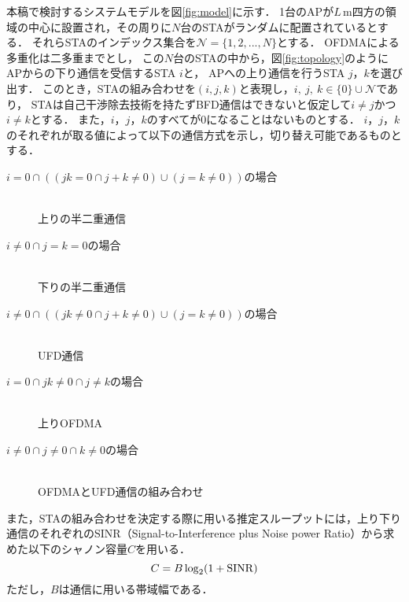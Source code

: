 \documentclass[technicalreport]{ieicej}
\newcommand{\sijk}{(i,j,k)}
\newcommand{\mN}{{\mathcal N}}
\begin{document}
	本稿で検討するシステムモデルを図\ref{fig:model}に示す．
	1台のAPが$L$\,m四方の領域の中心に設置され，その周りに$N$台のSTAがランダムに配置されているとする．
	それらSTAのインデックス集合を$\mN=\{1,2,...,N\}$とする．
	OFDMAによる多重化は二多重までとし，
	この$N$台のSTAの中から，図\ref{fig:topology}のようにAPからの下り通信を受信するSTA $i$と，
	APへの上り通信を行うSTA $j$，$k$を選び出す．
	このとき，STAの組み合わせを$\sijk$と表現し，$i,\ j,\ k \in \{0\}\cup \mN$であり，
	STAは自己干渉除去技術を持たずBFD通信はできないと仮定して$i\neq j$かつ$i\neq k$とする．
	また，$i$，$j$，$k$のすべてが0になることはないものとする．
	$i$，$j$，$k$のそれぞれが取る値によって以下の通信方式を示し，切り替え可能であるものとする．
	\begin{description}
		\item[\hspace{15pt}$i=0\cap ((jk=0 \cap j+k\neq0) \cup(j=k\neq0))$の場合]\mbox{}\\
			\hspace{30pt}上りの半二重通信
		\item[\hspace{15pt}$i\neq0 \cap j=k=0$の場合]\mbox{}\\
			\hspace{30pt}下りの半二重通信
		\item[\hspace{15pt}$i\neq0 \cap ((jk\neq0 \cap j+k\neq0) \cup (j=k\neq0))$の場合]\mbox{}\\
			\hspace{30pt}UFD通信
		\item[\hspace{15pt}$i=0 \cap jk\neq0 \cap j\neq k$の場合]\mbox{}\\
			\hspace{30pt}上りOFDMA
		\item[\hspace{15pt}$i\neq0 \cap j\neq0 \cap k\neq0$の場合]\mbox{}\\
			\hspace{30pt}OFDMAとUFD通信の組み合わせ
	\end{description}
	\par
	また，STAの組み合わせを決定する際に用いる推定スループットには，上り下り通信のそれぞれのSINR（Signal-to-Interference plus Noise power Ratio）から求めた以下のシャノン容量$C$を用いる．
	\begin{equation}
		C=B\log_2(1+{\rm SINR}) \label{eq:capacity}
	\end{equation}
	ただし，$B$は通信に用いる帯域幅である．
\end{document}
